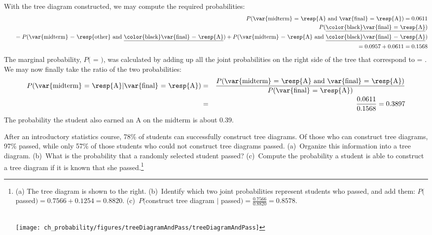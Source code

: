 \begin{example}
With the tree diagram constructed, we may compute the required probabilities:
\begin{eqnarray*}
&&P(\text{\var{midterm} = \resp{A} and \var{final} = \resp{A}}) = 0.0611 \\
&&P(\text{\underline{\color{black}\var{final} = \resp{A}}})  \\
&& \quad= P(\text{\var{midterm} = \resp{other} and \underline{\color{black}\var{final} = \resp{A}}}) + P(\text{\var{midterm} = \resp{A} and \underline{\color{black}\var{final} = \resp{A}}}) \\
&& \quad= 0.0957 + 0.0611  = 0.1568
\end{eqnarray*}
The marginal probability, $P($ = $)$, was calculated by adding up all the joint probabilities on the right side of the tree that correspond to  = . We may now finally take the ratio of the two probabilities:
\begin{eqnarray*}
P(\text{\var{midterm} = \resp{A}} | \text{\var{final} = \resp{A}}) &=& \frac{P(\text{\var{midterm} = \resp{A} and \var{final} = \resp{A}})}{P(\text{\var{final} = \resp{A}})} \\
&=& \frac{0.0611}{0.1568} = 0.3897
\end{eqnarray*}
The probability the student also earned an A on the midterm is about 0.39.
\end{example}

\begin{exercise}
After an introductory statistics course, 78\% of students can successfully construct tree diagrams. Of those who can construct tree diagrams, 97\% passed, while only 57\% of those students who could not construct tree diagrams passed. (a)~Organize this information into a tree diagram. (b)~What is the probability that a randomly selected student passed? (c)~Compute the probability a student is able to construct a tree diagram if it is known that she passed.\footnote{\begin{minipage}[t]{0.47\linewidth}
(a) The tree diagram is shown to the right.
(b)~Identify which two joint probabilities represent students who passed, and add them: $P($passed$) = 0.7566+0.1254= 0.8820$. (c)~$P($construct tree diagram $|$ passed$) = \frac{0.7566}{0.8820} = 0.8578$. \vspace{15mm} \\\ 
\end{minipage}
\begin{minipage}[c]{0.5\linewidth}
\texttt{[image: ch\_probability/figures/treeDiagramAndPass/treeDiagramAndPass]} \vspace{-25mm}
\end{minipage}}
\end{exercise}


